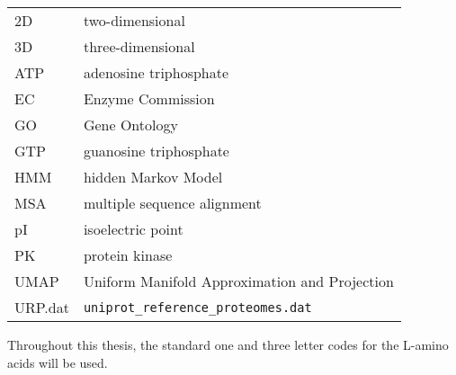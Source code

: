 
\begin{longtable}[l]{ l l }
  2D & two-dimensional \\
  3D & three-dimensional \\
  ATP & adenosine triphosphate \\
  EC & Enzyme Commission \\
  GO & Gene Ontology \\
  GTP & guanosine triphosphate \\
  HMM & hidden Markov Model \\
  MSA & multiple sequence alignment \\
  pI & isoelectric point \\
  PK & protein kinase \\
  UMAP & Uniform Manifold Approximation and Projection \\
  URP.dat & \texttt{uniprot\_reference\_proteomes.dat} \\
\end{longtable}

Throughout this thesis, the standard one and three letter codes for the L-amino acids will
be used.
